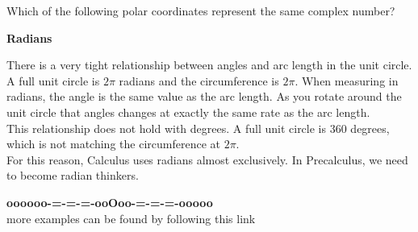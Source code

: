 \documentclass{ximera}
\begin{document}
\begin{question}
Which of the following polar coordinates represent the same complex number?
\begin{selectAll}
\end{selectAll}
\end{question}








\begin{warning} \textbf{\textcolor{red!80!black}{Radians}}


There is a very tight relationship between angles and arc length in the unit circle. \\


A full unit circle is $2\pi$ radians and the circumference is $2\pi$. When measuring in radians, the angle is the same value as the arc length.  As you rotate around the unit circle that angles changes at exactly the same rate as the arc length. \\

This relationship does not hold with degrees. A full unit circle is $360$ degrees, which is not matching  the circumference at $2\pi$. \\


For this reason, Calculus uses radians almost exclusively.  In Precalculus, we need to become radian thinkers.





\end{warning}









\begin{center}
\textbf{\textcolor{green!50!black}{oooooo-=-=-=-ooOoo-=-=-=-ooooo}} \\

more examples can be found by following this link\\ 

\end{center}
\end{document}
